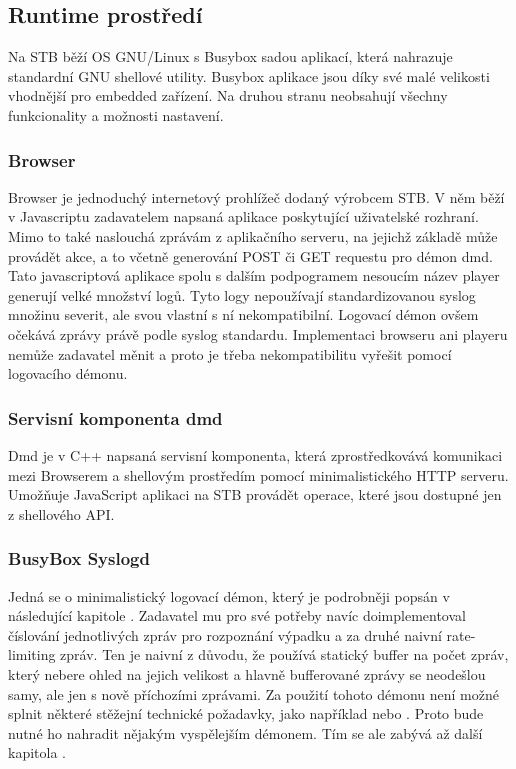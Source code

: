 \documentclass[thesis=B,czech]{FITthesis}[2012/06/26]
\begin{document}
\subsection{Runtime prostředí}
Na STB běží OS GNU/Linux s Busybox sadou aplikací, která nahrazuje standardní GNU shellové utility. Busybox aplikace jsou díky své malé velikosti vhodnější pro embedded zařízení. Na druhou stranu neobsahují všechny funkcionality a možnosti nastavení.

\subsubsection{Browser}
Browser je jednoduchý internetový prohlížeč dodaný výrobcem STB.
V něm běží v Javascriptu zadavatelem napsaná aplikace poskytující uživatelské rozhraní. Mimo to také naslouchá zprávám z aplikačního serveru, na jejichž základě může provádět akce, a to včetně generování POST či GET requestu pro démon dmd.
Tato javascriptová aplikace spolu s dalším podpogramem nesoucím název player generují velké množství logů. Tyto logy nepoužívají standardizovanou syslog množinu severit, ale svou vlastní s ní nekompatibilní. Logovací démon ovšem očekává zprávy právě podle syslog standardu. Implementaci browseru ani playeru nemůže zadavatel měnit a proto je třeba nekompatibilitu vyřešit pomocí logovacího démonu.

\subsubsection{Servisní komponenta dmd}
Dmd je v C++ napsaná servisní komponenta, která zprostředkovává komunikaci mezi Browserem a shellovým prostředím pomocí minimalistického HTTP serveru. Umožňuje JavaScript aplikaci na STB provádět operace, které jsou dostupné jen z shellového API.

\subsubsection{BusyBox Syslogd}
Jedná se o minimalistický logovací démon, který je podrobněji popsán v následující kapitole .
Zadavatel mu pro své potřeby navíc doimplementoval číslování jednotlivých zpráv pro rozpoznání výpadku a za druhé naivní rate-limiting zpráv. Ten je naivní z důvodu, že používá statický buffer na počet zpráv, který nebere ohled na jejich velikost a hlavně bufferované zprávy se neodešlou samy, ale jen s nově příchozími zprávami.
Za použití tohoto démonu není možné splnit některé stěžejní technické požadavky, jako například  nebo . Proto bude nutné ho nahradit nějakým vyspělejším démonem. Tím se ale zabývá až další kapitola .
\end{document}
